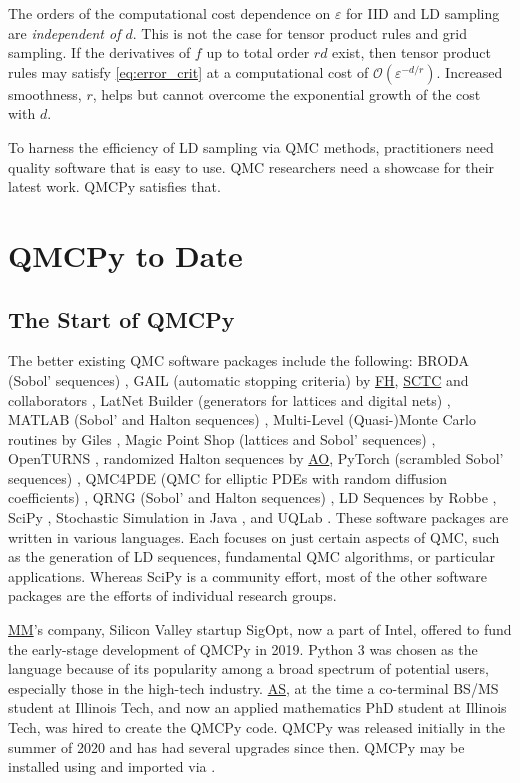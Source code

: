 \documentclass[11pt]{NSFamsart}
\newcommand{\FH}{\hyperlink{FHlink}{FH}\xspace}
\newcommand{\SCTC}{\hyperlink{SCTClink}{SCTC}\xspace}
\newcommand{\AO}{\hyperlink{AOlink}{AO}\xspace}
\newcommand{\MM}{\hyperlink{MMlink}{MM}\xspace}
\newcommand{\AS}{\hyperlink{ASlink}{AS}\xspace}
\newcommand{\Order}{\mathcal{O}}
\begin{document}
The orders of the computational cost dependence on $\varepsilon$ for IID and LD sampling are \emph{independent of $d$}.  This is not the case for tensor product rules and grid sampling.  If the derivatives of $f$ up to total order $rd$ exist, then tensor product rules may satisfy \eqref{eq:error_crit} at a computational cost of $\Order(\varepsilon^{-d/r})$.  Increased smoothness, $r$, helps but cannot overcome the exponential growth of the cost with $d$.

To harness the efficiency of LD sampling via QMC methods, practitioners need quality software that is easy to use.  QMC researchers need a showcase  for their latest work.  QMCPy satisfies that.

\section{QMCPy to Date}

\subsection{The Start of QMCPy}
The better existing QMC software packages include the following:
BRODA (Sobol' sequences) \cite{BRODA20a}, GAIL (automatic stopping criteria) by \FH, \SCTC and collaborators \cite{ChoEtal20a}, LatNet Builder (generators for lattices and digital nets) \cite{LatNet}, MATLAB (Sobol' and Halton sequences) \cite{MAT9.10}, Multi-Level (Quasi-)Monte Carlo routines  by Giles \cite{GilesSoft}, Magic Point Shop (lattices and Sobol' sequences) \cite{Nuy17a}, OpenTURNS \cite{OpenTURNS}, randomized Halton sequences by \AO \cite{Owe20a}, PyTorch (scrambled Sobol' sequences) \cite{paszke2019pytorch}, QMC4PDE (QMC for elliptic PDEs with random diffusion coefficients) \cite{KuoNuy16a}, QRNG (Sobol' and Halton sequences) \cite{QRNG2020}, LD Sequences by Robbe \cite{Rob20a}, SciPy \cite{virtanen2020scipy}, Stochastic Simulation in Java \cite{SSJ}, and
UQLab \cite{UQLab2014}.  These software packages are written in various languages.  
Each focuses on just certain aspects of QMC, such as the generation of LD sequences, fundamental QMC algorithms, or particular applications.  Whereas SciPy is a community effort, most of the other software packages are the efforts of individual research groups.

\MM's company, Silicon Valley startup SigOpt, now a part of Intel, offered to fund the early-stage development of  QMCPy in 2019. Python 3 was chosen as the language because of its popularity among a broad spectrum of potential users, especially those in the high-tech industry.  \AS,  at the time a co-terminal BS/MS student at Illinois Tech, and now an applied mathematics PhD student at Illinois Tech, was hired to create the QMCPy code.  QMCPy was released initially in the summer of 2020 and has had several upgrades since then.  QMCPy may be installed using  and imported via .
\end{document}
